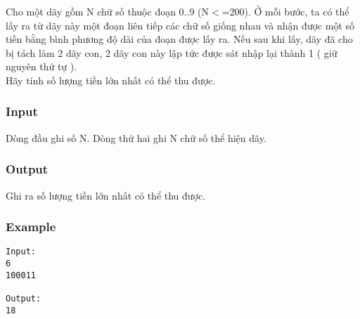 



   Cho một dãy gồm N chữ số thuộc đoạn 0..9 (N$<$=200). Ở mỗi bước, ta có thể lấy ra từ dãy này một đoạn liên tiếp các chữ số giống nhau và nhận được một số tiền bằng bình phương độ dài của đoạn được lấy ra. Nếu sau khi lấy, dãy đã cho bị tách làm 2 dãy con, 2 dãy con này lập tức được sát nhập lại thành 1 ( giữ nguyên thứ tự ).   
\\   Hãy tính số lượng tiền lớn nhất có thể thu được.  

\subsubsection{   Input  }

   Dòng đầu ghi số N. Dòng thứ hai ghi N chữ số thể hiện dãy.  

\subsubsection{   Output  }

   Ghi ra số lượng tiền lớn nhất có thể thu được.  

\subsubsection{   Example  }
\begin{verbatim}
Input:
6
100011

Output:
18
\end{verbatim}